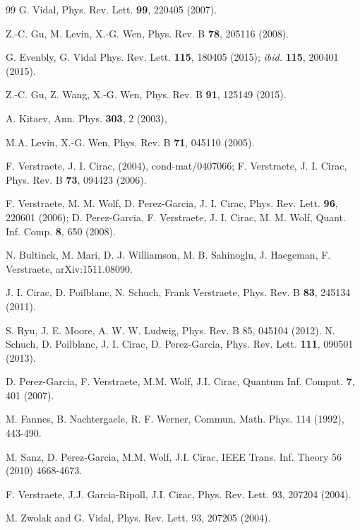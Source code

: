 \documentclass{elsarticle}
\begin{document}
\begin{thebibliography}{99}
    G. Vidal,
    Phys. Rev. Lett. {\bf 99}, 220405 (2007).

    Z.-C. Gu, M. Levin,  X.-G. Wen,
    Phys. Rev. B {\bf 78}, 205116 (2008).

    G. Evenbly,  G. Vidal
    Phys. Rev. Lett. {\bf 115}, 180405 (2015); {\it ibid.}
    {\bf 115}, 200401 (2015).

    Z.-C. Gu, Z. Wang,  X.-G. Wen,
    Phys. Rev. B {\bf 91}, 125149 (2015).

    A. Kitaev,
    Ann. Phys. {\bf 303}, 2 (2003),

    M.A. Levin, X.-G. Wen,
    Phys. Rev. B {\bf 71}, 045110 (2005).

    F. Verstraete, J. I. Cirac, (2004), cond-mat/0407066;
    F. Verstraete, J. I. Cirac, Phys. Rev. B {\bf 73}, 094423
    (2006).

    F. Verstraete, M. M. Wolf, D. Perez-Garcia,  J. I. Cirac,
    Phys. Rev. Lett. {\bf 96}, 220601 (2006);
    D. Perez-Garcia, F. Verstraete, J. I. Cirac,  M. M. Wolf,
    Quant. Inf. Comp. {\bf 8}, 650 (2008).


    N. Bultinck, M. Mari\xEBn, D. J. Williamson, M. B. Sahinoglu, J. Haegeman,  F. Verstraete,
    arXiv:1511.08090.

    J. I. Cirac, D. Poilblanc, N. Schuch, Frank Verstraete,
    Phys. Rev. B {\bf 83}, 245134 (2011).

    S. Ryu, J. E. Moore, A. W. W. Ludwig, Phys. Rev. B 85, 045104 (2012).
    N. Schuch, D. Poilblanc, J. I. Cirac,  D. Perez-Garcia,
    Phys. Rev. Lett. {\bf 111}, 090501 (2013).

    D. Perez-Garcia, F. Verstraete, M.M. Wolf,  J.I. Cirac,
    Quantum Inf. Comput. {\bf 7}, 401 (2007).

    M. Fannes, B. Nachtergaele, R. F. Werner,
    Commun. Math. Phys. 114 (1992), 443-490.

    M. Sanz, D. Perez-Garcia, M.M. Wolf, J.I. Cirac,
    IEEE Trans. Inf. Theory 56 (2010) 4668-4673.

    F. Verstraete, J.J. Garcia-Ripoll, J.I. Cirac,
    Phys. Rev. Lett. 93, 207204 (2004).

    M. Zwolak and G. Vidal,  Phys. Rev. Lett. 93, 207205 (2004).


\end{thebibliography}
\end{document}
